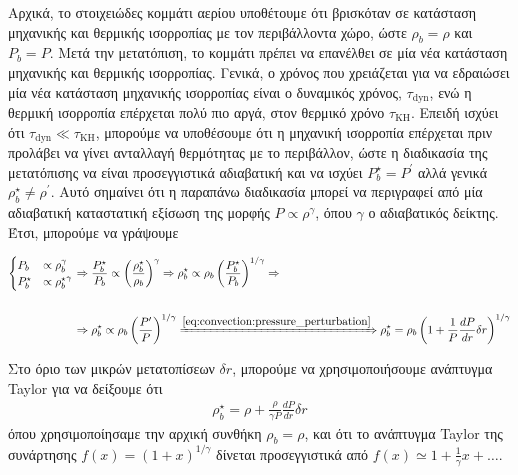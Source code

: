 Αρχικά, το στοιχειώδες κομμάτι αερίου υποθέτουμε ότι βρισκόταν σε κατάσταση μηχανικής και θερμικής ισορροπίας με τον περιβάλλοντα χώρο, ώστε $\rho_b = \rho$ και $P_b = P$. Μετά την μετατόπιση, το κομμάτι πρέπει να επανέλθει σε μία νέα κατάσταση μηχανικής και θερμικής ισορροπίας. Γενικά, ο χρόνος που χρειάζεται για να εδραιώσει μία νέα κατάσταση μηχανικής ισορροπίας είναι ο δυναμικός χρόνος, $\tau_{\text{dyn}}$, ενώ η θερμική ισορροπία επέρχεται πολύ πιο αργά, στον θερμικό χρόνο $\tau_{\text{KH}}$. Επειδή ισχύει ότι $\tau_{\text{dyn}} \ll \tau_{\text{KH}}$, μπορούμε να υποθέσουμε ότι η μηχανική ισορροπία επέρχεται πριν προλάβει να γίνει ανταλλαγή θερμότητας με το περιβάλλον, ώστε η διαδικασία της μετατόπισης να είναι προσεγγιστικά αδιαβατική και να ισχύει $P_b^{\star} = P^{\prime}$ αλλά γενικά $\rho_b^{\star} \neq \rho^{\prime}$. Αυτό σημαίνει ότι η παραπάνω διαδικασία μπορεί να περιγραφεί από μία αδιαβατική καταστατική εξίσωση της μορφής $P \propto \rho^{\gamma}$, όπου $\gamma$ ο αδιαβατικός δείκτης. Έτσι, μπορούμε να γράψουμε

\begin{align*}
    \begin{cases}
        P_b &\propto \rho_b^{\gamma} \\
        P_b^{\star} &\propto {\rho_b^{\star}}^{\gamma}
    \end{cases} &\Rightarrow
    \frac{ P_b^{\star}}{P_b} \propto \left(\frac{\rho_b^{\star}}{\rho_b}\right)^{\gamma} \Rightarrow \rho_b^{\star} \propto \rho_b \left(\frac{P_b^{\star}}{P_b} \right)^{1/\gamma} \Rightarrow \\\\
    &\Rightarrow \rho_b^{\star} \propto \rho_b \left(\frac{P^{\prime}}{P} \right)^{1/\gamma} \xRightarrow{\eqref{eq:convection:pressure_perturbation}}{\rho_b^{\star} = \rho_b \left(1 + \frac{1}{P} \frac{dP}{dr}\delta r \right)^{1/\gamma}}
\end{align*}

Στο όριο των μικρών μετατοπίσεων $\delta r$, μπορούμε να χρησιμοποιήσουμε ανάπτυγμα Taylor για να δείξουμε ότι
\begin{eqnarray}
    \label{eq:convection:new_blob_density_expression}
    \rho_b^{\star} = \rho + \frac{\rho}{\gamma P} \frac{dP}{dr} \delta r
\end{eqnarray}
όπου χρησιμοποίησαμε την αρχική συνθήκη $\rho_b = \rho$, και ότι το ανάπτυγμα Taylor της συνάρτησης $f(x) = (1+x)^{1/\gamma}$ δίνεται προσεγγιστικά από $f(x) \simeq 1 + \frac{1}{\gamma}x + \dots$.


